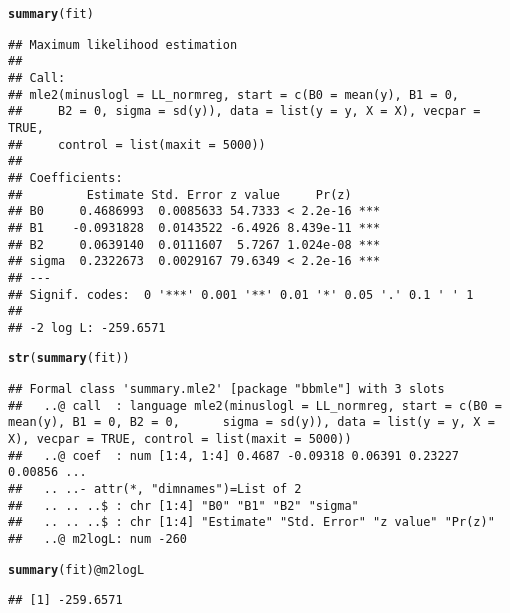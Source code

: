 \documentclass{article}\usepackage[]{graphicx}\usepackage[]{color}
\makeatletter
\newcommand{\hlopt}[1]{\textcolor[rgb]{0,0,0}{#1}}%
\newcommand{\hlstd}[1]{\textcolor[rgb]{0.345,0.345,0.345}{#1}}%
\newcommand{\hlkwc}[1]{\textcolor[rgb]{0.333,0.667,0.333}{#1}}%
\newcommand{\hlkwd}[1]{\textcolor[rgb]{0.737,0.353,0.396}{\textbf{#1}}}%
\newenvironment{kframe}{%
 \def\at@end@of@kframe{}%
 \ifinner\ifhmode%
  \def\at@end@of@kframe{\end{minipage}}%
  \begin{minipage}{\columnwidth}%
 \fi\fi%
 \def\FrameCommand##1{\hskip\@totalleftmargin \hskip-\fboxsep
 \colorbox{shadecolor}{##1}\hskip-\fboxsep
     \hskip-\linewidth \hskip-\@totalleftmargin \hskip\columnwidth}%
 \MakeFramed {\advance\hsize-\width
   \@totalleftmargin\z@ \linewidth\hsize
   \@setminipage}}%
 {\par\unskip\endMakeFramed%
 \at@end@of@kframe}
\newenvironment{knitrout}{}{} %
\makeatother
\begin{document}
\begin{knitrout}
\begin{kframe}
{\ttfamily\noindent\color{warningcolor}{\#\# Warning in dnorm(y, X \%*\% B, sigma, log = T): NaNs produced}}\begin{alltt}
\hlkwd{summary}\hlstd{(fit)}
\end{alltt}
\begin{verbatim}
## Maximum likelihood estimation
## 
## Call:
## mle2(minuslogl = LL_normreg, start = c(B0 = mean(y), B1 = 0, 
##     B2 = 0, sigma = sd(y)), data = list(y = y, X = X), vecpar = TRUE, 
##     control = list(maxit = 5000))
## 
## Coefficients:
##         Estimate Std. Error z value     Pr(z)    
## B0     0.4686993  0.0085633 54.7333 < 2.2e-16 ***
## B1    -0.0931828  0.0143522 -6.4926 8.439e-11 ***
## B2     0.0639140  0.0111607  5.7267 1.024e-08 ***
## sigma  0.2322673  0.0029167 79.6349 < 2.2e-16 ***
## ---
## Signif. codes:  0 '***' 0.001 '**' 0.01 '*' 0.05 '.' 0.1 ' ' 1
## 
## -2 log L: -259.6571
\end{verbatim}
\begin{alltt}
\hlkwd{str}\hlstd{(}\hlkwd{summary}\hlstd{(fit))}
\end{alltt}
\begin{verbatim}
## Formal class 'summary.mle2' [package "bbmle"] with 3 slots
##   ..@ call  : language mle2(minuslogl = LL_normreg, start = c(B0 = mean(y), B1 = 0, B2 = 0,      sigma = sd(y)), data = list(y = y, X = X), vecpar = TRUE, control = list(maxit = 5000))
##   ..@ coef  : num [1:4, 1:4] 0.4687 -0.09318 0.06391 0.23227 0.00856 ...
##   .. ..- attr(*, "dimnames")=List of 2
##   .. .. ..$ : chr [1:4] "B0" "B1" "B2" "sigma"
##   .. .. ..$ : chr [1:4] "Estimate" "Std. Error" "z value" "Pr(z)"
##   ..@ m2logL: num -260
\end{verbatim}
\begin{alltt}
\hlkwd{summary}\hlstd{(fit)}\hlopt{@}\hlkwc{m2logL}
\end{alltt}
\begin{verbatim}
## [1] -259.6571
\end{verbatim}
\end{kframe}
\end{knitrout}
\end{document}
